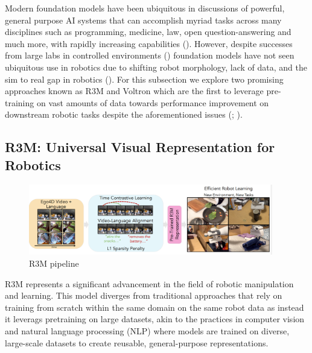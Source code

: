 \documentclass[
  letterpaper,
  DIV=11,
  numbers=noendperiod,
  oneside]{scrreprt}
\theoremstyle{remark}
\begin{document}
Modern foundation models have been ubiquitous in discussions of
powerful, general purpose AI systems that can accomplish myriad tasks
across many disciplines such as programming, medicine, law, open
question-answering and much more, with rapidly increasing capabilities
().
However, despite successes from large labs in controlled environments
() foundation models
have not seen ubiquitous use in robotics due to shifting robot
morphology, lack of data, and the sim to real gap in robotics
(). For this
subsection we explore two promising approaches known as R3M and Voltron
which are the first to leverage pre-training on vast amounts of data
towards performance improvement on downstream robotic tasks despite the
aforementioned issues (;
).

\subsection{R3M: Universal Visual Representation for
Robotics}\label{r3m-universal-visual-representation-for-robotics}

\begin{figure}[H]

{\centering \includegraphics[width=0.95\textwidth,height=\textheight]{src/Figures/r3m.png}

}

\caption{R3M pipeline}

\end{figure}%

R3M represents a significant advancement in the field of robotic
manipulation and learning. This model diverges from traditional
approaches that rely on training from scratch within the same domain on
the same robot data as instead it leverags pretraining on large
datasets, akin to the practices in computer vision and natural language
processing (NLP) where models are trained on diverse, large-scale
datasets to create reusable, general-purpose representations.
\end{document}
